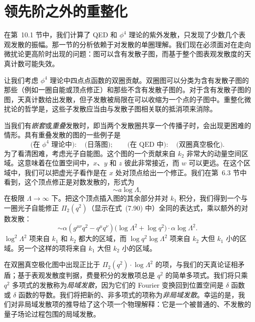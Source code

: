 \section{领先阶之外的重整化}

在第~10.1 节中，我们计算了 QED 和 $\phi^4$ 理论的紫外发散，只发现了少数几个表观发散的振幅。那一节的分析依赖于对发散的单圈理解。我们现在必须面对在走向微扰论更高阶时出现的问题：图可以含有发散子图，而基于整个图表观发散度的天真计数可能失效。

让我们考虑 $\phi^4$ 理论中四点点函数的双圈贡献。双圈图可以分类为含有发散子图的那些（例如一圈自能或顶点修正）和那些不含有发散子图的。对于含有发散子图的图，天真计数给出发散，但子发散被局限在可以收缩为一个点的子图中。重整化微扰论的哲学是，这些子发散应当由与发散子图相关联的抵消项来消除。

当我们有\emph{嵌套}或\emph{重叠}发散时，即当两个发散圈共享一个传播子时，会出现更困难的情形。具有重叠发散的图的一些例子是
\begin{equation}
  \text{(在 } \phi^4 \text{ 理论中)}:\quad \text{(日落图)};\qquad
  \text{(在 QED 中)}:\quad \text{(双圈真空极化)} .
\end{equation}
为了看清困难，考虑光子自能图。这个图的一个贡献来自 $k_2$ 非常大的动量空间区域。这意味着在位置空间中，$x$、$y$ 和 $z$ 彼此非常接近，而 $w$ 可以更远。在这个区域中，我们可以把虚光子看作是在 $x$ 处对顶点给出一个修正。我们在第~6.3 节中看到，这个顶点修正是对数发散的，形式为
\begin{equation}
  \sim a\log\Lambda ,
\end{equation}
在极限 $\Lambda\to\infty$ 下。把这个顶点插入图的其余部分并对 $k_1$ 积分，我们得到一个与一圈光子自能修正 $\Pi_2(q^2)$（显示在式~(7.90) 中）全同的表达式，乘以额外的对数发散：
\begin{equation}
  \sim \alpha(g^{\mu\nu}q^2 - q^\mu q^\nu)\bigl( \log\Lambda^2
    + \log q^2 \bigr)\cdot\alpha\log\Lambda^2 .
  \label{eq:10.50}
\end{equation}
$\log^2\Lambda^2$ 项来自 $k_1$ 和 $k_2$ 都大的区域，而 $\log q^2\log\Lambda^2$ 项来自 $k_2$ 大但 $k_1$ 小的区域。另一个这样的项将来自 $k_1$ 大但 $k_2$ 小的区域。

在双圈真空极化图中出现正比于 $\Pi_2(q^2)\cdot\log\Lambda^2$ 的项，与我们的天真论证相矛盾；基于表观发散度判据，费曼积分的发散项总是 $q^2$ 的简单多项式。我们将只乘 $q^2$ 多项式的发散称为\emph{局域发散}，因为它们的 Fourier 变换回到位置空间是 $\delta$ 函数或 $\delta$ 函数的导数。我们将把新的、非多项式的项称为\emph{非局域发散}。幸运的是，我们对非局域发散项的推导给了这个项一个物理解释：它是一个被普通的、不发散的量子场论过程包围的局域发散。

